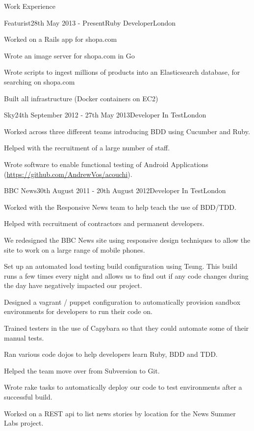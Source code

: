 \documentclass{resume}
\begin{document}
  \begin{rSection}{Work Experience}
    \begin{rSubsection}{Featurist}{28th May 2013 - Present}{Ruby Developer}{London}
    \item Worked on a Rails app for shopa.com
    \item Wrote an image server for shopa.com in Go
    \item Wrote scripts to ingest millions of products into an Elasticsearch database, for searching on shopa.com
    \item Built all infrastructure (Docker containers on EC2)
    \end{rSubsection}

    \begin{rSubsection}{Sky}{24th September 2012 - 27th May 2013}{Developer In Test}{London}
      \item Worked across three different teams introducing BDD using Cucumber and Ruby.
      \item Helped with the recruitment of a large number of staff.
      \item Wrote software to enable functional testing of Android Applications (\url{https://github.com/AndrewVos/acouchi}).
    \end{rSubsection}

    \begin{rSubsection}{BBC News}{30th August 2011 - 20th August 2012}{Developer In Test}{London}
      \item Worked with the Responsive News team to help teach the use of BDD/TDD.
      \item Helped with recruitment of contractors and permanent developers.
      \item We redesigned the BBC News site using responsive design techniques to allow the site to work on a large range of mobile phones.
      \item Set up an automated load testing build configuration using Tsung. This build runs a few times every night and allows us to find out if any code changes during the day have negatively impacted our project.
      \item Designed a vagrant / puppet configuration to automatically provision sandbox environments for developers to run their code on.
      \item Trained testers in the use of Capybara so that they could automate some of their manual tests.
      \item Ran various code dojos to help developers learn Ruby, BDD and TDD.
      \item Helped the team move over from Subversion to Git.
      \item Wrote rake tasks to automatically deploy our code to test environments after a successful build.
      \item Worked on a REST api to list news stories by location for the News Summer Labs project.
    \end{rSubsection}


\end{rSection}
\end{document}
